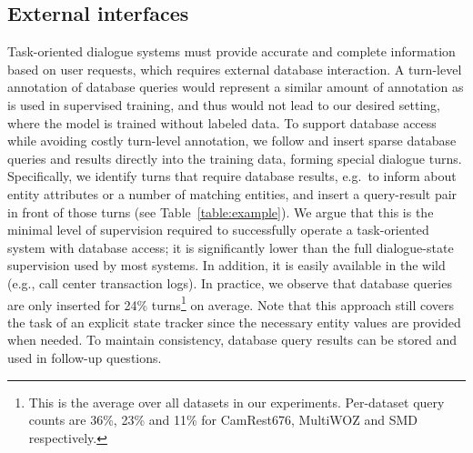 \subsection{External interfaces}
Task-oriented dialogue systems must provide accurate and complete information based on user requests, which requires external database interaction.
%
A turn-level annotation of database queries would represent a similar amount of annotation as is used in supervised training, and thus would not lead to our desired setting, where the model is trained without labeled data.
To support database access while avoiding costly turn-level annotation, we follow \citet{bordes2016learning} and 
insert sparse database queries and results directly into the training data, forming special dialogue turns.
Specifically, we identify turns that require database results, e.g.\ to inform about entity attributes or a number of matching entities, and insert a query-result pair in front of those turns (see Table~\ref{table:example}). We argue that this is the minimal level of supervision required to successfully operate a task-oriented system with database access; it is significantly lower than the full dialogue-state supervision used by most systems.
In addition, it is easily available in the wild (e.g., call center transaction logs).
In practice, we observe that database queries are only inserted for 24\% turns\footnote{This is the average over all datasets in our experiments. Per-dataset query counts are 36\%, 23\% and 11\% for CamRest676, MultiWOZ and SMD respectively.} on average.
Note that this approach still covers the task of an explicit state tracker since the necessary entity values are provided when needed.
To maintain consistency, database query results can be stored and used in follow-up questions.
